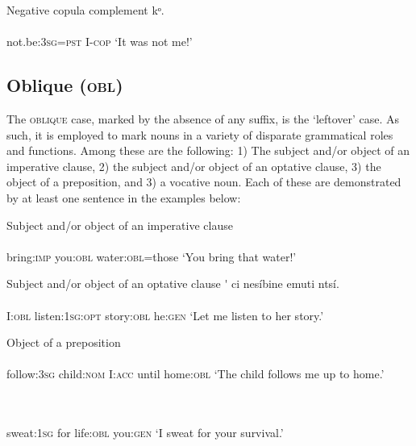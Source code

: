 Negative copula complement
\ea\label{ex:}
kᵒ. \\
    \\
not.be:\textsc{3sg}=\textsc{pst}   I-\textsc{cop}
\glt ‘It was not me!’ 
\z






\subsection{Oblique (\textsc{obl})}


The \textsc{oblique} case, marked by the absence of any suffix, is the ‘leftover’ case. As such, it is employed to mark nouns in a variety of disparate grammatical roles and functions. Among these are the following: 1) The subject and/or object of an imperative clause, 2) the subject and/or object of an optative clause, 3) the object of a preposition, and 3) a vocative noun. Each of these are demonstrated by at least one sentence in the examples below:




Subject and/or object of an imperative clause
\ea\label{ex:}
 \\
    \\
bring:\textsc{imp}   you:\textsc{obl}   water:\textsc{obl}=those
\glt ‘You bring that water!’ 
\z

Subject and/or object of an optative clause
\ea\label{ex:}
\'{} ci   nesíbine     emuti     ntsí. \\
    \\
I:\textsc{obl}   listen:\textsc{1sg:opt}   story:\textsc{obl}   he:\textsc{gen}
\glt ‘Let me listen to her story.’ 
\z




Object of a preposition
\ea\label{ex:}
 \\
    \\
follow:\textsc{3sg}   child:\textsc{nom}   I:\textsc{acc}   until   home:\textsc{obl}
\glt ‘The child follows me up to home.’ 
\z




\ea\label{ex:}
 \\
    \\
sweat:\textsc{1sg}   for     life:\textsc{obl}   you:\textsc{gen}
\glt ‘I sweat for your survival.’ 
\z





